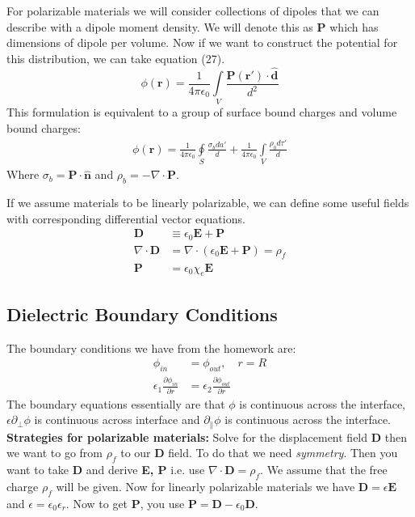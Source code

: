\documentclass[a4paper, 11pt]{article}
\begin{document}
		\noindent For polarizable materials we will consider collections of dipoles that we can describe with a dipole moment density. We will denote this as $\mathbf{P}$ which has dimensions of dipole per volume. Now if we want to construct the potential for this distribution, we can take equation (27). 
			\begin{equation*}
				\phi(\mathbf{r}) = \frac{1}{4 \pi \epsilon_0}\int\limits_V \frac{\mathbf{P(r')}\cdot \hat{\mathbf{d}}}{d^2}
			\end{equation*}
		This formulation is equivalent to a group of surface bound charges and volume bound charges: 
			\begin{align}
				\phi(\mathbf{r}) = \frac{1}{4\pi\epsilon_0}\oint\limits_S\frac{\sigma_b da'}{d} + \frac{1}{4\pi\epsilon_0}\int\limits_V\frac{\rho_b d\tau'}{d}
			\end{align}
		Where $\sigma_b = \mathbf{P} \cdot \hat{\mathbf{n}}$ and $\rho_b = -\nabla \cdot \mathbf{P}$.
		
		If we assume materials to be linearly polarizable, we can define some useful fields with corresponding differential vector equations. 
			\begin{align}
				\mathbf{D} &\equiv \epsilon_0 \mathbf{E} + \mathbf{P} \\ 
				\nabla \cdot \mathbf{D} &= \nabla \cdot (\epsilon_0 \mathbf{E} + \mathbf{P}) = \rho_f \\
				\mathbf{P} &= \epsilon_0\chi_e\mathbf{E}
			\end{align}
	\subsection*{Dielectric Boundary Conditions}
		The	boundary conditions we have from the homework are: 
			\begin{align}
				\phi_{in} &= \phi_{out}, \quad r=R \\ 
				\epsilon_1 \frac{\partial \phi_{in}}{\partial r} &= \epsilon_2 \frac{\partial \phi_{out}}{\partial r}
			\end{align}
		The boundary equations essentially are that $\phi$ is continuous across the interface, $\epsilon\partial_\bot\phi$ is continuous across interface and $\partial_\parallel \phi$ is continuous across the interface. \\ 
		
		\noindent \textbf{Strategies for polarizable materials:} Solve for the displacement field \textbf{D} then we want to go from $\rho_f$ to our \textbf{D} field. To do that we need \textit{symmetry}. Then you want to take \textbf{D} and derive \textbf{E, P} i.e. use $\nabla \cdot \mathbf{D} = \rho_f$. We assume that the free charge $\rho_f$ will be given.  Now for linearly polarizable materials we have $\mathbf{D} = \epsilon\mathbf{E}$ and $\epsilon = \epsilon_0\epsilon_r$. Now to get \textbf{P}, you use $\mathbf{P} = \mathbf{D} - \epsilon_0\mathbf{D}$. \\
		
\end{document}

